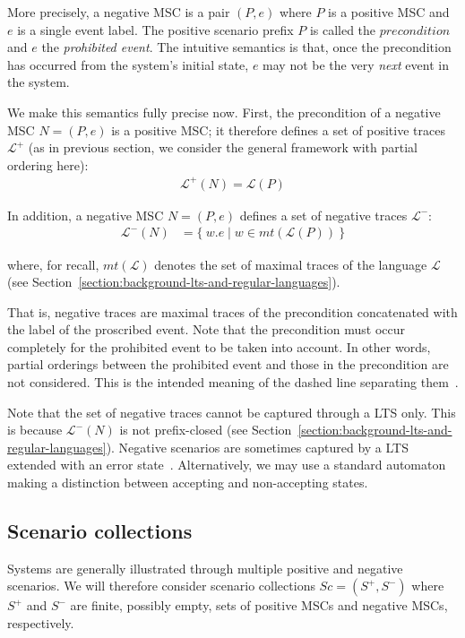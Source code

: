 More precisely, a negative MSC is a pair $(P,e)$ where $P$ is a positive MSC and $e$ is a single event label. The positive scenario prefix $P$ is called the $precondition$ and $e$ the \emph{prohibited event}. The intuitive semantics is that, once the precondition has occurred from the system's initial state, $e$ may not be the very \emph{next} event in the system. 

We make this semantics fully precise now. First, the precondition of a negative MSC $N = (P,e)$ is a positive MSC; it therefore defines a set of positive traces $\mathcal{L}^{+}$ (as in previous section, we consider the general framework with partial ordering here):
\begin{align}
\mathcal{L}^{+}(N) = \mathcal{L}(P)
\end{align}

\noindent In addition, a negative MSC $N = (P,e)$ defines a set of negative traces $\mathcal{L}^{-}$:
\begin{align}
\mathcal{L}^{-}(N) &= \{~w.e \mid w \in mt(\mathcal{L}(P))~\}
\end{align}

\noindent where, for recall, $mt(\mathcal{L})$ denotes the set of maximal traces of the language $\mathcal{L}$ (see Section~\ref{section:background-lts-and-regular-languages}).

That is, negative traces are maximal traces of the precondition concatenated with the label of the proscribed event. Note that the precondition must occur completely for the prohibited event to be taken into account. In other words, partial orderings between the prohibited event and those in the precondition are not considered. This is the intended meaning of the dashed line separating them~\cite{Uchitel:2004}. 

Note that the set of negative traces cannot be captured through a LTS only. This is because $\mathcal{L}^{-}(N)$ is not prefix-closed (see Section~\ref{section:background-lts-and-regular-languages}). Negative scenarios are sometimes captured by a LTS extended with an error state~\cite{Uchitel:2004}. Alternatively, we may use a standard automaton making a distinction between accepting and non-accepting states. 

\subsection{Scenario collections\label{subsection:background-scenario-collections}}

Systems are generally illustrated through multiple positive and negative scenarios. We will therefore consider scenario collections $Sc = (S^+,S^-)$ where $S^+$ and $S^-$ are finite, possibly empty, sets of positive MSCs and negative MSCs, respectively.

